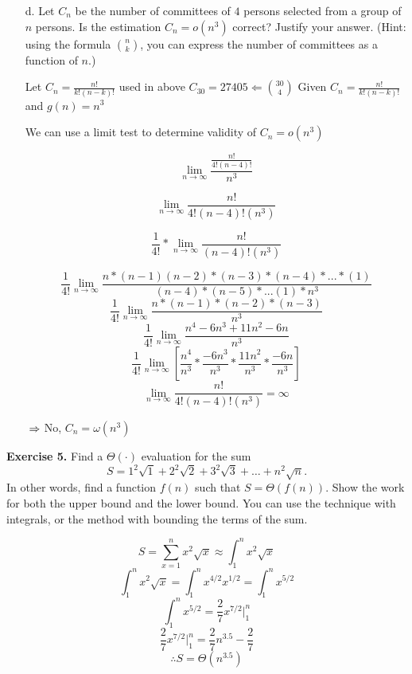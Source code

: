 \documentclass[12pt,letterpaper,final]{report}
\begin{document}
\begin{enumerate}
\item[d.] Let $C_n$ be the number of committees of $4$ persons selected from a group of $n$ persons.  Is the estimation $C_n = o(n^3)$ correct? Justify your answer. (Hint: using the formula ${n \choose k}$, you can express the number of committees as a function of $n$.)

Let $C_{n} = \frac{n!}{k!(n-k)!}$ used in above $C_{30} = 27405 \Leftarrow\binom{30}{4}$ 
Given $C_n = \frac{n!}{k!(n-k)!}$ and $g(n)= n^3$

We can use a limit test to determine validity of $C_n = o(n^3)$ 

\[ \lim_{n\to\infty} \frac{\frac{n!}{4!(n-4)!}}{n^3}\]

\[ \lim_{n\to\infty} \frac{n!}{4!(n-4)!(n^3)}\]

\[ \frac{1}{4!} * \lim_{n\to\infty} \frac{n!}{(n-4)!(n^3)}\]

\[ \frac{1}{4!} \lim_{n\to\infty} \frac{n*(n-1)(n-2)*(n-3)*(n-4)*...*(1)}{(n-4)*(n-5)*...(1)*n^3}\]
\[ \frac{1}{4!} \lim_{n\to\infty} \frac{n*(n-1)*(n-2)*(n-3)}{n^3}\]
\[ \frac{1}{4!} \lim_{n\to\infty} \frac{n^4-6n^3+11n^2-6n}{n^3}\]
\[ \frac{1}{4!} \lim_{n\to\infty} [\frac{n^4}{n^3}*\frac{-6n^3}{n^3}*\frac{11 n^2}{n^3}*\frac{-6n}
{n^3}]\]
\[ \lim_{n\to\infty} \frac{n!}{4!(n-4)!(n^3)}= \infty\]

$\newline\Rightarrow $ No, $C_n = \omega(n^3)$
\end{enumerate}
\bigskip

\textbf{Exercise 5.}
Find a $\Theta(\cdot)$ evaluation for the sum
\[S = 1^2\sqrt{1} + 2^2 \sqrt{2} + 3^2 \sqrt{3} + \ldots + n^2 \sqrt{n}.\]
In other words, find a function $f(n)$ such that $S = \Theta(f(n))$. Show the work for both the upper bound and the lower bound. You can use the technique with integrals, or the  method with bounding the terms of the sum.

    \[S=\sum_{x=1}^n x^2\sqrt{x} \approx \int_1^nx^2\sqrt{x}\]
    \[\int_1^nx^2\sqrt{x} = \int_1^nx^{4/2}x^{1/2} = \int_1^nx^{5/2}\]
    \[\int_1^nx^{5/2} = \frac{2}{7}x^{7/2}\bigg|_1^n\]
    \[\frac{2}{7}x^{7/2}\bigg|_1^n = \frac{2}{7}n^{3.5} - \frac{2}{7}\]
    \[\therefore S = \Theta(n^{3.5})\]
\end{document}
